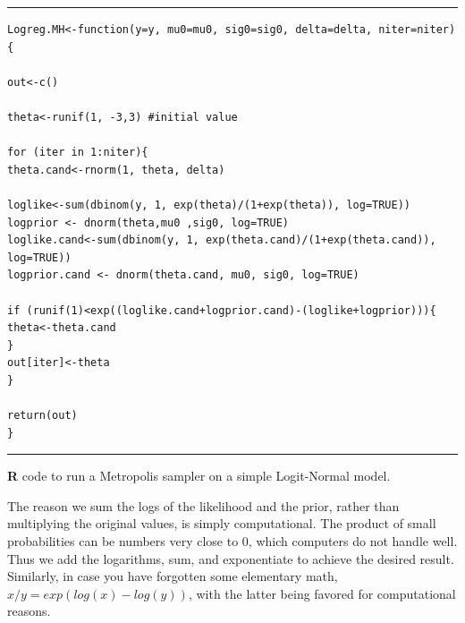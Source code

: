 \begin{panel}[htp]
\centering
\rule[0.15in]{\textwidth}{.03in}
{\small
\begin{verbatim}
Logreg.MH<-function(y=y, mu0=mu0, sig0=sig0, delta=delta, niter=niter) {

out<-c()

theta<-runif(1, -3,3) #initial value

for (iter in 1:niter){
theta.cand<-rnorm(1, theta, delta)

loglike<-sum(dbinom(y, 1, exp(theta)/(1+exp(theta)), log=TRUE))
logprior <- dnorm(theta,mu0 ,sig0, log=TRUE)
loglike.cand<-sum(dbinom(y, 1, exp(theta.cand)/(1+exp(theta.cand)), log=TRUE))
logprior.cand <- dnorm(theta.cand, mu0, sig0, log=TRUE)

if (runif(1)<exp((loglike.cand+logprior.cand)-(loglike+logprior))){
theta<-theta.cand
}
out[iter]<-theta
}

return(out)
}
\end{verbatim}
}
\rule[-0.15in]{\textwidth}{.03in}
\caption{
{\bf R} code to run a Metropolis sampler on a simple Logit-Normal model.
}
\label{mcmc.panel.logitnormal}
\end{panel}



The reason we sum the logs of the likelihood and the prior, rather than multiplying the original values, is simply computational. The product of small probabilities can be numbers very close to 0, which computers do not handle well. Thus we add the logarithms, sum, and exponentiate to achieve the desired result. Similarly, in case you have forgotten some elementary math, $x/y = exp(log(x)-log(y))$, with the latter being favored for computational reasons.

